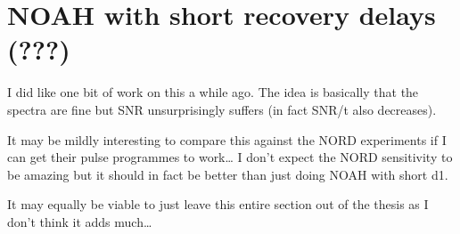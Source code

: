 \section{NOAH with short recovery delays (???)}
\label{sec:noah__shortd1}

I did like one bit of work on this a while ago.
The idea is basically that the spectra are fine but SNR unsurprisingly suffers (in fact SNR/t also decreases).

It may be mildly interesting to compare this against the NORD experiments if I can get their pulse programmes to work\ldots{} I don't expect the NORD sensitivity to be amazing but it should in fact be better than just doing NOAH with short d1.

It may equally be viable to just leave this entire section out of the thesis as I don't think it adds much\ldots{}
